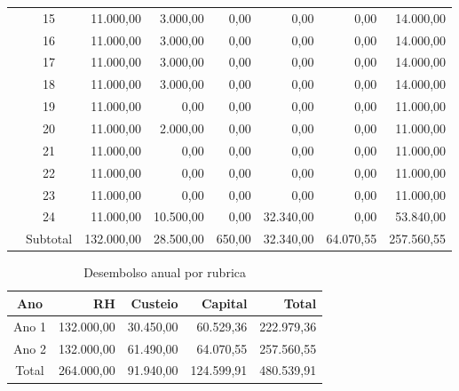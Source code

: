 \begin{table}[!h]
\begin{tabular}{lcrrrrrr}
             & 15       &  11.000,00 &  3.000,00 &   0,00  &      0,00   &      0,00 &  14.000,00\\
             & 16       &  11.000,00 &  3.000,00 &   0,00  &      0,00   &      0,00 &  14.000,00\\
             & 17       &  11.000,00 &  3.000,00 &   0,00  &      0,00   &      0,00 &  14.000,00\\
             & 18       &  11.000,00 &  3.000,00 &   0,00  &      0,00   &      0,00 &  14.000,00\\
             & 19       &  11.000,00 &      0,00 &   0,00  &      0,00   &      0,00 &   11.000,00\\
             & 20       &  11.000,00 &  2.000,00 &   0,00  &      0,00   &      0,00 &   11.000,00\\
             & 21       &  11.000,00 &      0,00 &   0,00  &      0,00   &      0,00 &   11.000,00\\
             & 22       &  11.000,00 &      0,00 &   0,00  &      0,00   &      0,00 &   11.000,00\\
             & 23       &  11.000,00 &      0,00 &   0,00  &      0,00   &      0,00 &   11.000,00\\
             & 24       &  11.000,00 & 10.500,00 &   0,00  & 32.340,00   &      0,00 &  53.840,00\\
\midrule
	     & Subtotal & 132.000,00 & 28.500,00 & 650,00  & 32.340,00   & 64.070,55 & 257.560,55\\
\bottomrule
\end{tabular}
	\label{tab:geral-mes-tipo}
\end{table}

\begin{table}[!h]
	\caption{Desembolso anual por rubrica}
\centering
\begin{tabular}{crrrr}
\toprule
	Ano   & RH         & Custeio   & Capital    & Total \\
\midrule
	Ano 1 & 132.000,00  & 30.450,00 & 60.529,36  & 222.979,36\\
	Ano 2 & 132.000,00  & 61.490,00 & 64.070,55  & 257.560,55\\
\midrule
	Total & 264.000,00 & 91.940,00 & 124.599,91 & 480.539,91\\
\bottomrule
\end{tabular}
	\label{tab:geral-ano-rubrica}
\end{table}
%
